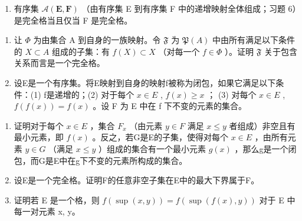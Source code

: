 \begin{enumerate}
\def\labelenumi{(\alph{enumi})}
\setcounter{enumi}{3}
\tightlist
\item
  有序集 \(\mathcal{A}(\mathbf{E},\mathbf{F})\) （由有序集 E 到有序集 F 中的递增映射全体组成；习题 6）是完全格当且仅当 F 是完全格。
\end{enumerate}

\begin{enumerate}
\def\labelenumi{\arabic{enumi}.}
\setcounter{enumi}{11}
\item
  让 \(\Phi\) 为由集合 A 到自身的一族映射。令 \(\mathfrak{F}\) 为 \(\mathfrak{P}(A)\) 中由所有满足以下条件的 \(X \subset A\) 组成的子集：有 \(f(X) \subset X\) （对每一个 \(f \in \Phi\) ）。证明 \(\mathfrak{F}\) 关于包含关系而言是一个完全格。
\item
  设E是一个有序集。将E映射到自身的映射f被称为闭包，如果它满足以下条件：(1) f是递增的；(2) 对于每个 \(x \in E\) , \(f(x) \geqslant x\) ； (3) 对每个 \(x \in E\) , \(f(f(x)) = f(x)\) 。设 F 为 E 中在 f 下不变的元素的集合。
\end{enumerate}

\begin{enumerate}
\def\labelenumi{(\alph{enumi})}
\item
  证明对于每个 \(x \in E\) ，集合 \(F_{x}\) （由元素 \(y \in F\) 满足 \(x \leqslant y\) 者组成）非空且有最小元素，即 \(f(x)\) 。反之，若G是E的子集，使得对每个 \(x \in E\) ，由所有元素 \(y \in G\) （满足 \(x \leqslant y\) ）组成的集合有一个最小元素 \(g(x)\) ，那么g是一个闭包，而G是E中在g下不变的元素所构成的集合。
\item
  设E是一个完全格。证明F的任意非空子集在E中的最大下界属于F。
\item
  证明若 E 是一个格，则 \(f(\sup(x,y)) = f(\sup(f(x),y))\) 对于 E 中每一对元素 x, y。
\end{enumerate}


